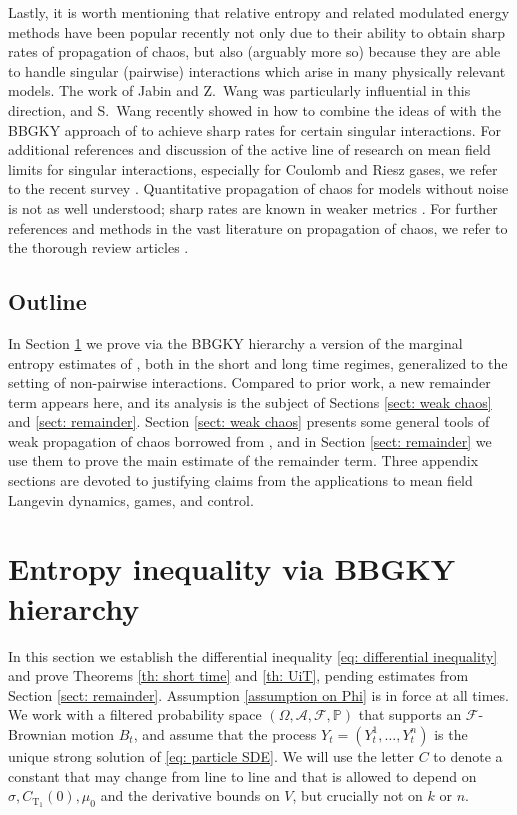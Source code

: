 \documentclass[11pt,reqno]{amsart}
\numberwithin{equation}{section}
\theoremstyle{definition}
\def\P{{\mathbb P}}
\begin{document}
Lastly, it is worth mentioning that relative entropy and related modulated energy methods have been popular recently not only due to their ability to obtain sharp rates of propagation of chaos, but also (arguably more so) because they are able to handle singular (pairwise) interactions which arise in many physically relevant models. The work of Jabin and Z.\ Wang \cite{JabinWangBounded,JWEntropicChaos} was particularly influential in this direction, and S.\ Wang recently showed in \cite{wang2024sharplocalpropagationchaos} how to combine the ideas of \cite{JWEntropicChaos} with the BBGKY approach of \cite{HierarchiesPaper} to achieve sharp rates for certain singular interactions. For additional references and discussion of the active line of research on mean field limits for singular interactions, especially for Coulomb and Riesz gases, we refer to the recent survey \cite{serfaty2024lectures}.
Quantitative propagation of chaos for models without noise is not as well understood; sharp rates are known  in weaker metrics \cite{Paul2019SizeOfChaos,Duerinckx2021SizeOfChaos}.
For further references and methods in the vast literature on propagation of chaos, we refer to the thorough review  articles \cite{ChaintronChaos1,ChaintronChaos2}.


\subsection{Outline} In Section \ref{sect: entropic inequality} we prove via the BBGKY hierarchy a version of the marginal entropy estimates of \cite{HierarchiesPaper,SharpChaosLacker2023}, both in the short and long time regimes, generalized to the setting of non-pairwise interactions. Compared to prior work, a new remainder term appears here, and its analysis is the subject of Sections \ref{sect: weak chaos} and \ref{sect: remainder}. Section \ref{sect: weak chaos}  presents some general tools of weak propagation of chaos borrowed from \cite{Chassagneux2022-jt}, and in Section \ref{sect: remainder} we use them to prove the main estimate of the remainder term. Three appendix sections are devoted to justifying claims from the applications to mean field Langevin dynamics, games, and control.


\section{Entropy inequality via BBGKY hierarchy}
\label{sect: entropic inequality}
In this section we establish the differential inequality \eqref{eq: differential inequality} and prove Theorems \ref{th: short time} and \ref{th: UiT}, pending estimates from Section \ref{sect: remainder}. Assumption \ref{assumption on Phi} is in force at all times. We work with a filtered probability space $(\Omega,\mathcal A,\mathcal F,\P)$ that supports an $\mathcal F$-Brownian motion $B_t$, and assume that the process $Y_t=(Y_t^1,\dots,Y_t^n)$ is the unique strong solution of \eqref{eq: particle SDE}. We will use the letter $C$ to denote a constant that may change from line to line and that is allowed to depend on $\sigma,C_{\text{T}_1}(0),\mu_0$ and the derivative bounds on $V$, but crucially not on $k$ or $n$.
\end{document}
